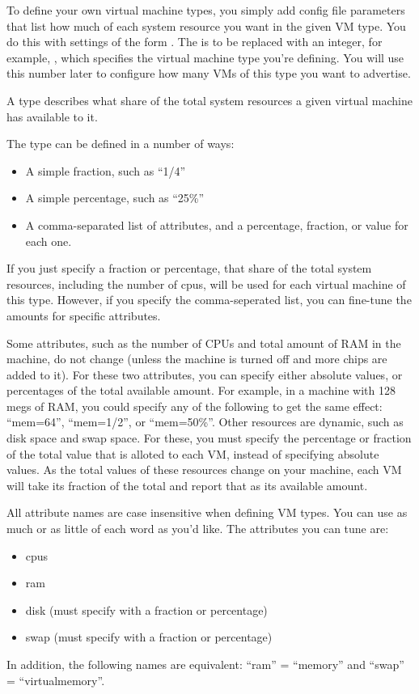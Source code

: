 To define your own virtual machine types, you simply add config file
parameters that list how much of each system resource you want in the
given VM type.  You do this with settings of the form
.
The  is to be replaced with an integer, for example, 
, which specifies the virtual 
machine type you're defining.
You will use this number later to configure how many VMs of this type
you want to advertise.

A type describes what share of the total system resources a given
virtual machine has available to it.

The type can be defined in a number of ways:
\begin{itemize}
  \item A simple fraction, such as ``1/4''
  \item A simple percentage, such as ``25\%''
  \item A comma-separated list of attributes, and a percentage,
	fraction, or value for each one.
\end{itemize}
If you just specify a fraction or percentage, that share of the total
system resources, including the number of cpus, will be used for each
virtual machine of this type.
However, if you specify the comma-seperated list, you can fine-tune
the amounts for specific attributes.

Some attributes, such as the number of CPUs and total amount of RAM in
the machine, do not change (unless the machine is turned off and more
chips are added to it).
For these two attributes, you can specify either absolute values, or
percentages of the total available amount.  
For example, in a machine with 128 megs of RAM, you could specify any
of the following to get the same effect: ``mem=64'', ``mem=1/2'', or
``mem=50\%''.
Other resources are dynamic, such as disk space and swap space.
For these, you must specify the percentage or fraction of the total
value that is alloted to each VM, instead of specifying absolute values.
As the total values of these resources change on your machine, each
VM will take its fraction of the total and report that as its
available amount.

All attribute names are case insensitive when defining VM types.
You can use as much or as little of each word as you'd like.
The attributes you can tune are:
\begin{itemize}
  \item cpus
  \item ram
  \item disk (must specify with a fraction or percentage)
  \item swap (must specify with a fraction or percentage)
\end{itemize}
In addition, the following names are equivalent: ``ram'' = ``memory''
and ``swap'' = ``virtualmemory''.

